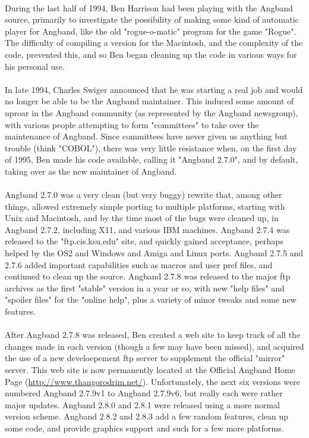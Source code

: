 \paragraph{}During the last half of 1994, Ben Harrison had been playing with
the Angband source, primarily to investigate the possibility of making
some kind of automatic player for Angband, like the old "rogue-o-matic"
program for the game "Rogue".  The difficulty of compiling a version
for the Macintosh, and the complexity of the code, prevented this, and
so Ben began cleaning up the code in various ways for his personal use.

\paragraph{}In late 1994, Charles Swiger announced that he was starting a real job
and would no longer be able to be the Angband maintainer.  This induced
some amount of uproar in the Angband community (as represented by the
Angband newsgroup), with various people attempting to form "committees"
to take over the maintenance of Angband.  Since committees have never
given us anything but trouble (think "COBOL"), there was very little
resistance when, on the first day of 1995, Ben made his code available,
calling it "Angband 2.7.0", and by default, taking over as the new
maintainer of Angband.

\paragraph{}Angband 2.7.0 was a very clean (but very buggy) rewrite that, among other
things, allowed extremely simple porting to multiple platforms, starting
with Unix and Macintosh, and by the time most of the bugs were cleaned up,
in Angband 2.7.2, including X11, and various IBM machines.  Angband 2.7.4
was released to the "ftp.cis.ksu.edu" site, and quickly gained acceptance,
perhaps helped by the OS2 and Windows and Amiga and Linux ports.  Angband
2.7.5 and 2.7.6 added important capabilities such as macros and user pref
files, and continued to clean up the source.  Angband 2.7.8 was released
to the major ftp archives as the first "stable" version in a year or so,
with new "help files" and "spoiler files" for the "online help", plus a
variety of minor tweaks and some new features.

\paragraph{}After Angband 2.7.8 was released, Ben created a web site to keep track of
all the changes made in each version (though a few may have been missed),
and acquired the use of a new develoepement ftp server to supplement the
official "mirror" server.  This web site is now permanently located at
the Official Angband Home Page (\url{http://www.thangorodrim.net/}).
Unfortunately, the next six versions were numbered Angband 2.7.9v1 to
Angband 2.7.9v6, but really each were rather major updates.  Angband 2.8.0
and 2.8.1 were released using a more normal version scheme.  Angband 2.8.2
and 2.8.3 add a few random features, clean up some code, and provide
graphics support and such for a few more platforms.

